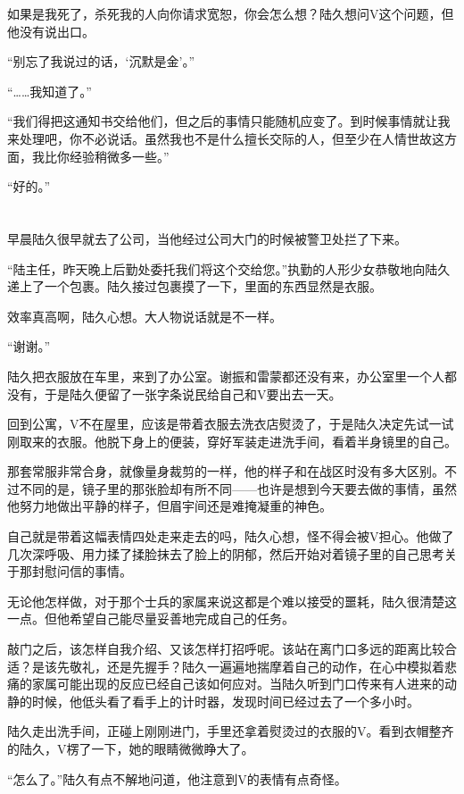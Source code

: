 如果是我死了，杀死我的人向你请求宽恕，你会怎么想？陆久想问V这个问题，但他没有说出口。

“别忘了我说过的话，‘沉默是金’。”

“……我知道了。”

“我们得把这通知书交给他们，但之后的事情只能随机应变了。到时候事情就让我来处理吧，你不必说话。虽然我也不是什么擅长交际的人，但至少在人情世故这方面，我比你经验稍微多一些。”

“好的。”

\section*{}

早晨陆久很早就去了公司，当他经过公司大门的时候被警卫处拦了下来。

“陆主任，昨天晚上后勤处委托我们将这个交给您。”执勤的人形少女恭敬地向陆久递上了一个包裹。陆久接过包裹摸了一下，里面的东西显然是衣服。

效率真高啊，陆久心想。大人物说话就是不一样。

“谢谢。”

陆久把衣服放在车里，来到了办公室。谢振和雷蒙都还没有来，办公室里一个人都没有，于是陆久便留了一张字条说民给自己和V要出去一天。

回到公寓，V不在屋里，应该是带着衣服去洗衣店熨烫了，于是陆久决定先试一试刚取来的衣服。他脱下身上的便装，穿好军装走进洗手间，看着半身镜里的自己。

那套常服非常合身，就像量身裁剪的一样，他的样子和在战区时没有多大区别。不过不同的是，镜子里的那张脸却有所不同——也许是想到今天要去做的事情，虽然他努力地做出平静的样子，但眉宇间还是难掩凝重的神色。

自己就是带着这幅表情四处走来走去的吗，陆久心想，怪不得会被V担心。他做了几次深呼吸、用力揉了揉脸抹去了脸上的阴郁，然后开始对着镜子里的自己思考关于那封慰问信的事情。

无论他怎样做，对于那个士兵的家属来说这都是个难以接受的噩耗，陆久很清楚这一点。但他希望自己能尽量妥善地完成自己的任务。

敲门之后，该怎样自我介绍、又该怎样打招呼呢。该站在离门口多远的距离比较合适？是该先敬礼，还是先握手？陆久一遍遍地揣摩着自己的动作，在心中模拟着悲痛的家属可能出现的反应已经自己该如何应对。当陆久听到门口传来有人进来的动静的时候，他低头看了看手上的计时器，发现时间已经过去了一个多小时。

陆久走出洗手间，正碰上刚刚进门，手里还拿着熨烫过的衣服的V。看到衣帽整齐的陆久，V楞了一下，她的眼睛微微睁大了。

“怎么了。”陆久有点不解地问道，他注意到V的表情有点奇怪。

